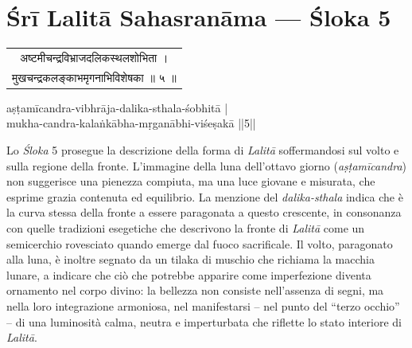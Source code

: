 \chapter*{Śrī Lalitā Sahasranāma — Śloka 5}

\begin{sloka}
{\sanskritfont
\begin{tabular}{c}
अष्टमीचन्द्रविभ्राजदलिकस्थलशोभिता ।\\
मुखचन्द्रकलङ्काभमृगनाभिविशेषका ॥ ५ ॥
\end{tabular}

\vspace{1.5em}

{\middlesize \iastfont
aṣṭamīcandra-vibhrāja-dalika-sthala-śobhitā |\\
mukha-candra-kalaṅkābha-mṛganābhi-viśeṣakā ||5|| \\}

\vspace{1em}

{\middlesize
{}
}

\middlesize \iastfont {}


}
\end{sloka}


Lo \textit{Śloka} 5 prosegue la descrizione della forma di \textit{Lalitā} soffermandosi sul volto e sulla regione della fronte. L’immagine della luna dell’ottavo giorno (\textit{aṣṭamīcandra}) non suggerisce una pienezza compiuta, ma una luce giovane e misurata, che esprime grazia contenuta ed equilibrio. La menzione del \textit{dalika-sthala} indica che è la curva stessa della fronte a essere paragonata a questo crescente, in consonanza con quelle tradizioni esegetiche che descrivono la fronte di \textit{Lalitā} come un semicerchio rovesciato quando emerge dal fuoco sacrificale. Il volto, paragonato alla luna, è inoltre segnato da un tilaka di muschio che richiama la macchia lunare, a indicare che ciò che potrebbe apparire come imperfezione diventa ornamento nel corpo divino: la bellezza non consiste nell’assenza di segni, ma nella loro integrazione armoniosa, nel manifestarsi – nel punto del “terzo occhio” – di una luminosità calma, neutra e imperturbata che riflette lo stato interiore di \textit{Lalitā}.

